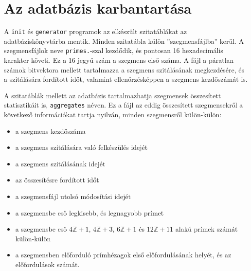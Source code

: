 \section{Az adatbázis karbantartása}

A \texttt{init} és \texttt{generator} programok az elkészült szitatáblákat az adatbáziskönyvtárba mentik.
Minden szitatábla külön ''szegmensfájlba'' kerül.
A szegmensfájlok neve \texttt{primes.}-szal kezdődik, és pontosan 16 hexadecimális karakter követi.
Ez a 16 jegyű szám a szegmens első száma.
A fájl a páratlan számok bitvektora mellett tartalmazza a szegmens szitálásának megkezdésére, és a szitálására fordított időt, valamint ellenőrzésképpen a szegmens kezdőszámát is.

A szitatáblák mellett az adatbázis tartalmazhatja szegmensek összesített statisztikáit is, \texttt{aggregates} néven.
Ez a fájl az eddig összesített szegmensekről a következő információkat tartja nyilván, minden szegmensről külön-külön:
\begin{itemize}
\item a szegmens kezdőszáma
\item a szegmens szitálására való felkészülés idejét
\item a szegmens szitálásának idejét
\item az összesítésre fordított időt
\item a szegmensfájl utolsó módosítási idejét
\item a szegmensbe eső legkisebb, és legnagyobb prímet
\item a szegmensbe eső $4\mathbb{Z}+1$, $4\mathbb{Z}+3$, $6\mathbb{Z}+1$ és $12\mathbb{Z}+11$ alakú prímek számát külön-külön
\item a szegmensben előforduló prímhézagok első előfordulásának helyét, és az előfordulások számát.
\end{itemize}

